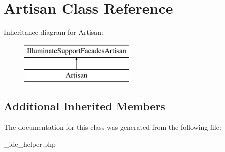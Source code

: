 \hypertarget{class_artisan}{}\section{Artisan Class Reference}
\label{class_artisan}
Inheritance diagram for Artisan\+:\begin{figure}[H]
\begin{center}
\leavevmode
\includegraphics[height=2.000000cm]{class_artisan}
\end{center}
\end{figure}
\subsection*{Additional Inherited Members}


The documentation for this class was generated from the following file\+:\begin{DoxyCompactItemize}
\item 
\+\_\+ide\+\_\+helper.\+php\end{DoxyCompactItemize}
